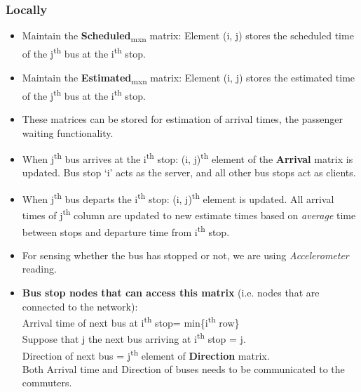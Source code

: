 \subsubsection{Locally}

\begin{itemize}

\item Maintain the \textbf{Scheduled}\textsubscript{mxn} matrix: Element (i, j) stores the scheduled time of the j\textsuperscript{th} bus at the i\textsuperscript{th} stop.
\item Maintain the \textbf{Estimated}\textsubscript{mxn} matrix: Element (i, j) stores the estimated time of the j\textsuperscript{th} bus at the i\textsuperscript{th} stop.
\item These matrices can be stored for estimation of arrival times, the passenger waiting functionality.
\item When j\textsuperscript{th} bus arrives at the i\textsuperscript{th} stop: (i, j)\textsuperscript{th} element of the \textbf{Arrival} matrix is updated. Bus stop `i' acts as the server, and all other bus stops act as clients.
\item When j\textsuperscript{th} bus departs the i\textsuperscript{th} stop: (i, j)\textsuperscript{th} element is updated. All arrival times of j\textsuperscript{th} column are updated to new estimate times based on \textit{average} time between stops and departure time from i\textsuperscript{th} stop.
\item For sensing whether the bus has stopped or not, we are using \textit{Accelerometer} reading.
\item \textbf{Bus stop nodes that can access this matrix} (i.e. nodes that are connected to the network):\\
\null \qquad Arrival time of next bus at i\textsuperscript{th} stop= min\{i\textsuperscript{th} row\}\\
\null \qquad Suppose that j the next bus arriving at i\textsuperscript{th} stop = j.\\
\null \qquad Direction of next bus = j\textsuperscript{th} element of \textbf{Direction} matrix.\\
\null \qquad Both Arrival time and Direction of buses needs to be communicated to the commuters.


\end{itemize}
